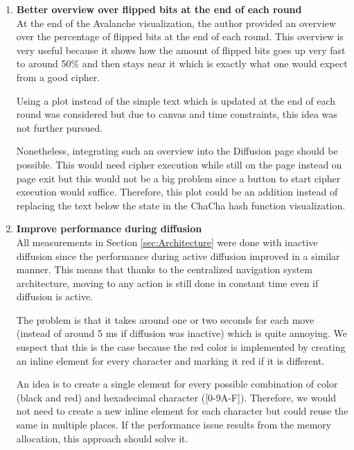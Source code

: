 \begin{enumerate}[wide, labelwidth=!, labelindent=0pt]
\setlength{\parskip}{0pt}

\item \textbf{Better overview over flipped bits at the end of each round}\\
At the end of the Avalanche visualization, the author provided an overview over the percentage of flipped bits at the end of each round. This overview is very useful because it shows how the amount of flipped bits goes up very fast to around 50\% and then stays near it which is exactly what one would expect from a good cipher.

Using a plot instead of the simple text which is updated at the end of each round was considered but due to canvas and time constraints, this idea was not further pursued. 

Nonetheless, integrating such an overview into the Diffusion page should be possible. This would need cipher execution while still on the page instead on page exit but this would not be a big problem since a button to start cipher execution would suffice. Therefore, this plot could be an addition instead of replacing the text below the state in the ChaCha hash function visualization.

\vfill
\pagebreak

\item \textbf{Improve performance during diffusion}\\
All measurements in Section \ref{sec:Architecture} were done with inactive diffusion since the performance during active diffusion improved in a similar manner. This means that thanks to the centralized navigation system architecture, moving to any action is still done in constant time even if diffusion is active.

The problem is that it takes around one or two seconds for each move (instead of around 5 ms if diffusion was inactive) which is quite annoying. We suspect that this is the case because the red color is implemented by creating an inline element for every character and marking it red if it is different.

An idea is to create a single element for every possible combination of color (black and red) and hexadecimal character ([0-9A-F]). Therefore, we would not need to create a new inline element for each character but could reuse the same in multiple places. If the performance issue results from the memory allocation, this approach should solve it. 


\end{enumerate}
